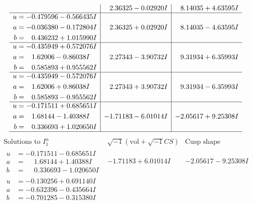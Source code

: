 \documentclass[1p]{elsarticle_modified}
\theoremstyle{definition}
\newcommand{\I}{\sqrt{-1}}
\begin{document}
$$\begin{array}{c|c|c}
 & \phantom{-}2.36325 - 0.02920 I & \phantom{-}8.14035 + 4.63595 I \\ \hline\begin{aligned}
u &= -0.479596 - 0.566435 I \\
a &= -0.036380 - 0.172804 I \\
b &= \phantom{-}0.436232 + 1.015990 I\end{aligned}
 & \phantom{-}2.36325 + 0.02920 I & \phantom{-}8.14035 - 4.63595 I \\ \hline\begin{aligned}
u &= -0.435949 + 0.572076 I \\
a &= \phantom{-}1.62006 - 0.86038 I \\
b &= \phantom{-}0.585893 + 0.955562 I\end{aligned}
 & \phantom{-}2.27343 - 3.90732 I & \phantom{-}9.31934 + 6.35993 I \\ \hline\begin{aligned}
u &= -0.435949 - 0.572076 I \\
a &= \phantom{-}1.62006 + 0.86038 I \\
b &= \phantom{-}0.585893 - 0.955562 I\end{aligned}
 & \phantom{-}2.27343 + 3.90732 I & \phantom{-}9.31934 - 6.35993 I \\ \hline\begin{aligned}
u &= -0.171511 + 0.685651 I \\
a &= \phantom{-}1.68144 - 1.40388 I \\
b &= \phantom{-}0.336693 + 1.020650 I\end{aligned}
 & -1.71183 - 6.01014 I & -2.05617 + 9.25308 I\\
 \hline 
 \end{array}$$\newpage$$\begin{array}{c|c|c}  
\text{Solutions to }I^u_{1}& \I (\text{vol} + \sqrt{-1}CS) & \text{Cusp shape}\\
 \hline 
\begin{aligned}
u &= -0.171511 - 0.685651 I \\
a &= \phantom{-}1.68144 + 1.40388 I \\
b &= \phantom{-}0.336693 - 1.020650 I\end{aligned}
 & -1.71183 + 6.01014 I & -2.05617 - 9.25308 I \\ \hline\begin{aligned}
u &= -0.130256 + 0.691140 I \\
a &= -0.632396 - 0.435664 I \\
b &= -0.701285 - 0.315380 I\end{aligned}

\end{array}$$
\end{document}
